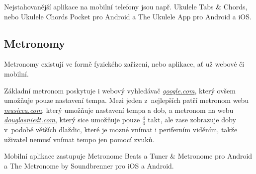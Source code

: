 Nejstahovanější aplikace na mobilní telefony jsou např. Ukulele Tabs \& Chords, nebo Ukulele Chords Pocket pro Android a The Ukulele App pro Android a iOS.

\subsection{Metronomy}
\label{ss:metronomes}
Metronomy existují ve formě fyzického zařízení, nebo aplikace, ať už webové či mobilní.

Základní metronom poskytuje i webový vyhledávač \href{www.google.com}{\emph{google.com}}, který ovšem umožňuje pouze nastavení tempa. Mezi jeden z~nejlepších patří metronom webu \href{www.musicca.com}{\emph{musicca.com}}, který umožňuje nastavení tempa a dob, a metronom na webu \href{www.douglasniedt.com}{\emph{douglasniedt.com}}, který sice umožňuje pouze $ \frac{4}{4} $ takt, ale zase zobrazuje doby v~podobě větších dlaždic, které je mozné vnímat i periferním viděním, takže uživatel nemusí vnímat tempo jen pomocí zvuků.

Mobilní aplikace zastupuje Metronome Beats a Tuner \& Metronome pro Android a The Metronome by Soundbrenner pro iOS a Android.
